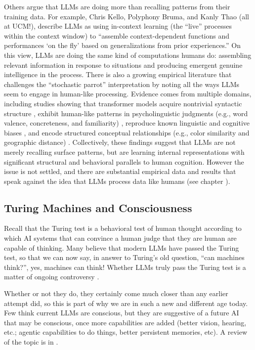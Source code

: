 Others argue that LLMs are doing more than recalling patterns from their training data. For example, Chris Kello, Polyphony Bruma, and Kanly Thao \cite{kello2026contextual} (all at UCM!), describe LLMs as using in-context learning (the ``live'' processes within the context window) to ``assemble context-dependent functions and performances `on the fly' based on generalizations from prior experiences.'' On this view, LLMs are doing the same kind of computations humans do: assembling relevant information in response to situations and producing emergent genuine intelligence in the process. There is also a growing empirical literature that challenges the
``stochastic parrot'' interpretation by noting all the ways LLMs seem to engage in human-like processing. Evidence comes from multiple domains,
including studies showing that transformer models acquire nontrivial
syntactic structure \cite{goldberg2019assessing, linzen2021syntactic, tenney2019bert},
exhibit human-like patterns in psycholinguistic judgments (e.g., word
valence, concreteness, and familiarity) \cite{trott2024augment, kello2026contextual},
reproduce known linguistic and cognitive biases \cite{cai2023do}, and encode structured
conceptual relationships (e.g., color similarity and geographic distance)
\cite{abdou2021can, lietard2021do, christiansen2023large}. Collectively,
these findings suggest that LLMs are not merely recalling surface patterns,
but are learning internal representations with significant structural and
behavioral parallels to human cognition. However the issue is not settled, and there are substantial empirical data and results that speak against the idea that LLMs process data like humans (see chapter ).

\subsection{Turing Machines and Consciousness}


Recall that the Turing test is a behavioral test of human thought according to which AI systems that can convince a human judge that they are human are capable of thinking. Many believe that modern LLMs have passed the Turing test, so that we can now say, in answer to Turing's old question, ``can machines think?'', yes, machines can think! Whether LLMs truly pass the Turing test is a matter of ongoing
controversy \cite{jones2024does}.

Whether or not they do, they certainly come much closer than any earlier attempt did, so this is part of why we are in such a new and different age today. Few think current LLMs are conscious, but they are suggestive of a future AI that may be conscious, once more capabilities are added (better vision, hearing, etc.; agentic capabilities to do things, better persistent memories, etc). A review of the topic is in \cite{chalmers2023llmconscious}.

